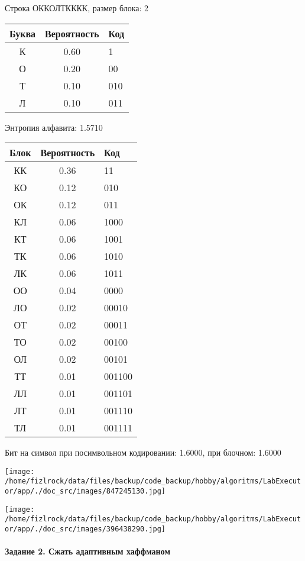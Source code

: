 \documentclass[a4paper, 12pt]{article}
\begin{document}
Строка ОККОЛТКККК, размер блока: 2
\begin{center}
 \begin{tabular}{ |c|c|l| } 
  \hline
     Буква & Вероятность & Код\\ \hline
К & 0.60 & 1\\\hline
О & 0.20 & 00\\\hline
Т & 0.10 & 010\\\hline
Л & 0.10 & 011
\\ \hline \end{tabular}
\end{center}
Энтропия алфавита: 1.5710
\begin{center}
 \begin{tabular}{ |c|c|l| } 
  \hline
     Блок & Вероятность & Код\\ \hline
КК & 0.36 & 11\\\hline
КО & 0.12 & 010\\\hline
ОК & 0.12 & 011\\\hline
КЛ & 0.06 & 1000\\\hline
КТ & 0.06 & 1001\\\hline
ТК & 0.06 & 1010\\\hline
ЛК & 0.06 & 1011\\\hline
ОО & 0.04 & 0000\\\hline
ЛО & 0.02 & 00010\\\hline
ОТ & 0.02 & 00011\\\hline
ТО & 0.02 & 00100\\\hline
ОЛ & 0.02 & 00101\\\hline
ТТ & 0.01 & 001100\\\hline
ЛЛ & 0.01 & 001101\\\hline
ЛТ & 0.01 & 001110\\\hline
ТЛ & 0.01 & 001111
\\ \hline \end{tabular}
\end{center}
Бит на символ при посимвольном кодировании: 1.6000, при блочном: 1.6000

\texttt{[image: /home/fizlrock/data/files/backup/code\_backup/hobby/algoritms/LabExecutor/app/./doc\_src/images/847245130.jpg]}

\texttt{[image: /home/fizlrock/data/files/backup/code\_backup/hobby/algoritms/LabExecutor/app/./doc\_src/images/396438290.jpg]}
\pagebreak
\paragraph{Задание 2. Сжать адаптивным хаффманом\\}
\end{document}
